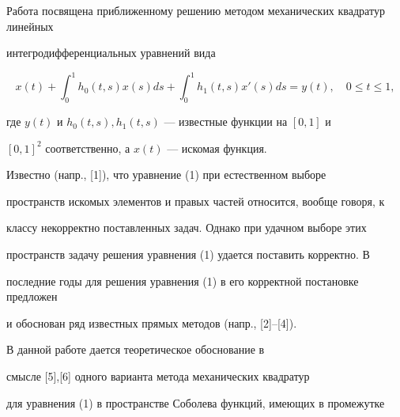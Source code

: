 \date{}




\pagestyle{plain} %







\maketitle


\label{begin}








Работа посвящена приближенному решению методом механических квадратур линейных


интегродифференциальных уравнений вида


\begin{equation}


x(t)+\int_0^1h_0(t,s)x(s)ds+\int_0^1h_1(t,s)x'(s)ds=y(t),


\quad 0\leq t\leq 1,


\end{equation}


где $y(t)$ и $h_0(t,s),h_1(t,s)$ --- известные функции на $[0,1]$ и


$[0,1]^2$ соответственно, а $x(t)$ --- искомая функция.





Известно (напр., [1]), что уравнение (1) при естественном выборе


пространств искомых элементов и правых частей относится, вообще говоря, к


классу некорректно поставленных задач. Однако при удачном выборе этих


пространств задачу решения уравнения (1) удается поставить корректно. В


последние годы для решения уравнения (1) в его корректной постановке предложен


и обоснован ряд известных прямых методов (напр., [2]--[4]).





В данной работе дается теоретическое обоснование в


смысле [5],[6] одного варианта метода механических квадратур


для уравнения (1) в пространстве Соболева функций, имеющих в промежутке


